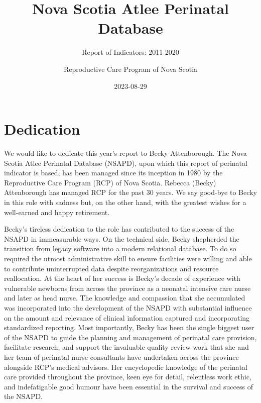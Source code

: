 \documentclass[
]{krantz}
\title{Nova Scotia Atlee Perinatal Database}
\subtitle{Report of Indicators: 2011-2020}
\author{Reproductive Care Program of Nova Scotia}
\date{2023-08-29}
\begin{document}
\pagestyle{empty}

\setcounter{page}{1}
\maketitle
\thispagestyle{empty}
\newpage


{
\hypersetup{linkcolor=}
\setcounter{tocdepth}{3}
\tableofcontents
\newpage
}


\hypertarget{dedication}{%
\chapter*{Dedication}\label{dedication}}


We would like to dedicate this year's report to Becky Attenborough. The Nova Scotia Atlee Perinatal Database (NSAPD), upon which this report of perinatal indicator is based, has been managed since its inception in 1980 by the Reproductive Care Program (RCP) of Nova Scotia. Rebecca (Becky) Attenborough has managed RCP for the past 30 years. We say good-bye to Becky in this role with sadness but, on the other hand, with the greatest wishes for a well-earned and happy retirement.

Becky's tireless dedication to the role has contributed to the success of the NSAPD in immeasurable ways. On the technical side, Becky shepherded the transition from legacy software into a modern relational database. To do so required the utmost administrative skill to ensure facilities were willing and able to contribute uninterrupted data despite reorganizations and resource reallocation. At the heart of her success is Becky's decade of experience with vulnerable newborns from across the province as a neonatal intensive care nurse and later as head nurse. The knowledge and compassion that she accumulated was incorporated into the development of the NSAPD with substantial influence on the amount and relevance of clinical information captured and incorporating standardized reporting. Most importantly, Becky has been the single biggest user of the NSAPD to guide the planning and management of perinatal care provision, facilitate research, and support the invaluable quality review work that she
and her team of perinatal nurse consultants have undertaken across the province alongside RCP's medical advisors. Her encyclopedic knowledge of the perinatal care provided throughout the province, keen eye for detail, relentless work ethic, and indefatigable good humour have been essential in the survival and success of the NSAPD.
\end{document}
